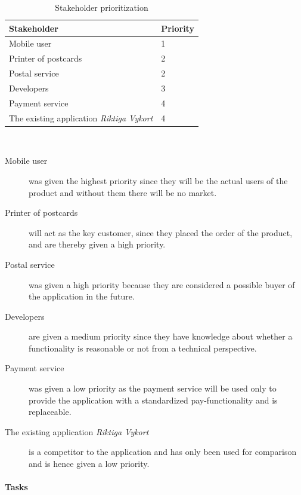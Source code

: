 \documentclass[10pt,a4paper]{article}
\begin{document}
\begin{table}[h!]
\centering
\label{table:deliv}
\begin{tabular}{|l|l|} \hline
\textbf{Stakeholder} & \textbf{Priority} \\
\hline
Mobile user & 1\\
\hline
Printer of postcards & 2\\
\hline
Postal service & 2\\
\hline
Developers & 3\\
\hline
Payment service & 4\\
\hline
The existing application \textit{Riktiga Vykort} & 4\\
\hline

\end{tabular}\\
\caption{Stakeholder prioritization}
\label{table:stakeholder}
\end{table}

\begin{description}
\item[Mobile user] was given the highest priority since they will be the actual users of the product and without them there will be no market.
\item[Printer of postcards] will act as the key customer, since they placed the order of the product, and are thereby given a high priority. 
\item[Postal service] was given a high priority because they are considered a possible buyer of the application in the future. 
\item[Developers] are given a medium priority since they have knowledge about whether a functionality is reasonable or not from a technical perspective.
\item[Payment service] was given a low priority as the payment service will be used only to provide the application with a standardized pay-functionality and is replaceable.
\item[The existing application \textit{Riktiga Vykort}]  is a competitor to the application and has only been used for comparison and is hence given a low priority. 

\end{description}


\paragraph{Tasks}
\end{document}
